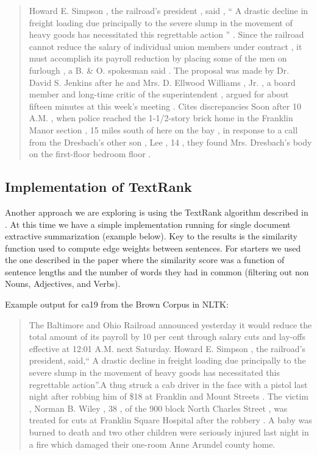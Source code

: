 \documentclass[10pt]{article}
\begin{document}
\begin{quote}
Howard E. Simpson , the railroad's president , said , `` A drastic decline in freight loading due principally to the severe slump in the movement of heavy goods has necessitated this regrettable action '' .
Since the railroad cannot reduce the salary of individual union members under contract , it must accomplish its payroll reduction by placing some of the men on furlough , a B. \& O. spokesman said .
The proposal was made by Dr. David S. Jenkins after he and Mrs. D. Ellwood Williams , Jr. , a board member and long-time critic of the superintendent , argued for about fifteen minutes at this week's meeting .
Cites discrepancies
Soon after 10 A.M. , when police reached the 1-1/2-story brick home in the Franklin Manor section , 15 miles south of here on the bay , in response to a call from the Dresbach's other son , Lee , 14 , they found Mrs. Dresbach's body on the first-floor bedroom floor .
\end{quote}

\subsection{Implementation of TextRank}

\label{sec:textrank}
Another approach we are exploring is using the TextRank algorithm described in \cite{textrank}. At this time we have a simple implementation running for single document extractive summarization (example below). Key to the results is the similarity function used to compute edge weights between sentences. For starters we used the one described in the paper where the similarity score was a function of sentence lengths and the number of words they had in common (filtering out non Nouns, Adjectives, and Verbs).

Example output for ca19 from the Brown Corpus in NLTK:
\begin{quote}
The Baltimore and Ohio Railroad announced yesterday it would reduce the total amount of its payroll by 10 per cent through salary cuts and lay-offs effective at 12:01 A.M. next Saturday. Howard E. Simpson , the railroad's president, said,`` A drastic decline in freight loading due principally to the severe slump in the movement of heavy goods has necessitated this regrettable action''.A thug struck a cab driver in the face with a pistol last night after robbing him of \$18 at Franklin and Mount Streets .
The victim , Norman B. Wiley , 38 , of the 900 block North Charles Street , was treated for cuts at Franklin Square Hospital after the robbery .
A baby was burned to death and two other children were seriously injured last night in a fire which damaged their one-room Anne Arundel county home.
\end{quote}
\end{document}
